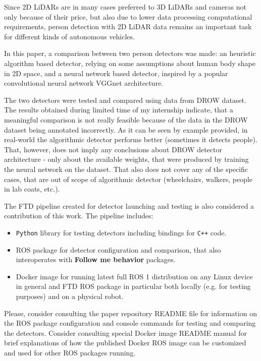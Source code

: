 \documentclass{article}
\begin{document}
Since 2D LiDARs are in many cases preferred to 3D LiDARs and cameras not only because of their price, but also due to lower data processing computational requirements\cite{2D_3D_lidars}, person detection with 2D LiDAR data remains an important task for different kinds of autonomous vehicles.

In this paper, a comparison between two person detectors was made: an heuristic algorithm based detector, relying on some assumptions about human body shape in 2D space, and a neural network based detector, inspired by a popular convolutional neural network VGGnet\cite{vggnet_paper} architecture. 

The two detectors were tested and compared using data from DROW dataset.
The results obtained during limited time of my internship indicate, that a meaningful comparison is not really feasible because of the data in the DROW dataset being annotated incorrectly.
As it can be seen by example provided, in real-world the algorithmic detector performs better (sometimes it detects people).
That, however, does not imply any conclusions about DROW detector architecture - only about the available weights, that were produced by training the neural network on the dataset.
That also does not cover any of the specific cases, that are out of scope of algorithmic detector (wheelchairs, walkers, people in lab coats, etc.).

The FTD pipeline created for detector launching and testing is also considered a contribution of this work.
The pipeline includes:
\begin{itemize}
    \item \texttt{Python} library for testing detectors including bindings for \texttt{C++} code.
    \item ROS package for detector configuration and comparison, that also interoperates with \textbf{Follow me behavior} packages.
    \item Docker image for running latest full ROS 1 distribution on any Linux device in general and FTD ROS package in particular both locally (e.g. for testing purposes) and on a physical robot.
\end{itemize}

Please, consider consulting the paper repository README file\cite{FTD_repo_readme} for information on the ROS package configuration and console commands for testing and comparing the detectors.
Consider consulting special Docker image README manual\cite{FTD_image_readme} for brief explanations of how the published Docker ROS image can be customized and used for other ROS packages running.
\end{document}
